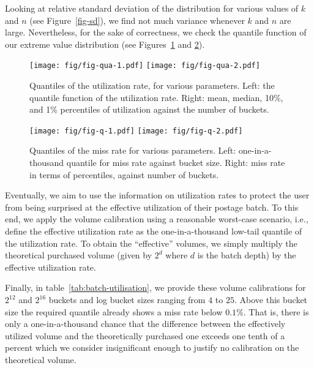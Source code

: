 Looking at relative standard deviation of the distribution for various values of $k$ and $n$ (see Figure~\ref{fig-sd}), we find not much variance whenever $k$ and $n$ are large. Nevertheless, for the sake of correctness, we check the quantile function of our extreme value distribution (see Figures~\ref{fig-qua} and \ref{fig-q}).

\begin{figure}[!ht]
  \centering
  \texttt{[image: fig/fig-qua-1.pdf]} \texttt{[image: fig/fig-qua-2.pdf]}
  \caption[Quantiles of the utilization rate]{\label{fig-qua}Quantiles of the utilization rate, for
various parameters. Left: the quantile function of the utilization
rate. Right: mean, median, 10\%, and 1\% percentiles of utilization against the number of buckets.}
\end{figure}

\begin{figure}[!ht]
  \centering
  \texttt{[image: fig/fig-q-1.pdf]} \texttt{[image: fig/fig-q-2.pdf]}
  \caption[Quantiles of the miss rate]{Quantiles of the miss rate for various parameters. Left: one-in-a-thousand quantile for miss rate against bucket size. Right: miss rate in terms of percentiles, against number of buckets.}
\label{fig-q}
\end{figure}

 
Eventually, we aim to use the information on utilization rates to
protect the user from being surprised at the effective utilization of
their postage batch. To this end, we apply the volume calibration using
a reasonable worst-case scenario, i.e., define the effective utilization
rate as the one-in-a-thousand low-tail quantile of the utilization rate.
To obtain the ``effective'' volumes, we simply multiply the theoretical
purchased volume (given by $2^d$ where $d$ is the batch depth) by
the effective utilization rate.


Finally, in table~\ref{tab:batch-utilisation}, we provide these volume calibrations for $2^{12}$ and
$2^{16}$ buckets and log bucket sizes ranging from $4$ to $25$.
Above this bucket size the required quantile already shows a miss rate
below $0.1\%$. That is, there is only a one-in-a-thousand chance that
the difference between the effectively utilized volume and the
theoretically purchased one exceeds one tenth of a percent which we
consider insignificant enough to justify no calibration on the
theoretical volume.

\newpage

